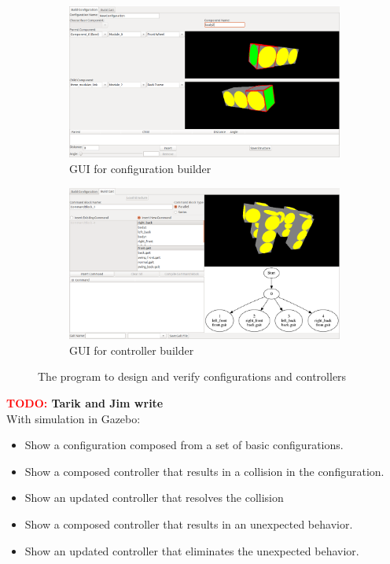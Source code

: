 \documentclass[conference]{IEEEtran}
\theoremstyle{definition}
\newcommand{\TODO}[1]{ {\bf \textcolor{red}{TODO:} #1 }}
\begin{document}
\begin{figure}
\begin{center}
        \begin{subfigure}[b]{0.9\columnwidth}
                \includegraphics[width=\textwidth]{images/conf_window.png}
                \caption{GUI for configuration builder}
                \label{fig:gui_conf}
           \end{subfigure}
           
        \begin{subfigure}[b]{0.9\columnwidth}
                \includegraphics[width=\textwidth]{images/gait_window.png}
                \caption{GUI for controller builder}
                \label{fig:gui_gait}
        \end{subfigure}
\end{center}
\caption{The program to design and verify configurations and controllers}
\label{fig:smores_conf}
\end{figure}





\TODO{Tarik and Jim write}\\
With simulation in Gazebo:
\begin{itemize}
\item Show a configuration composed from a set of basic configurations.
\item Show a composed controller that results in a collision in the configuration.
\item Show an updated controller that resolves the collision
\item Show a composed controller that results in an unexpected behavior.
\item Show an updated controller that eliminates the unexpected behavior.
\end{itemize}
\end{document}
